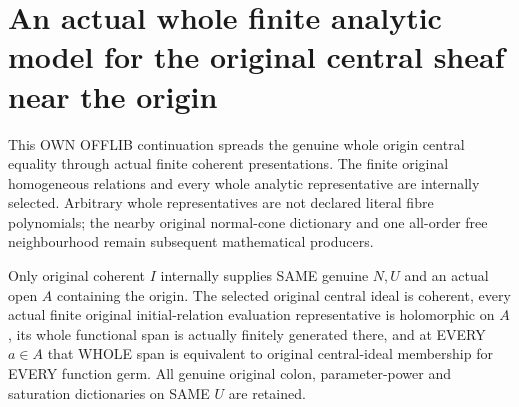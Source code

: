 \section{An actual whole finite analytic model for the original central sheaf near the origin}
This OWN OFFLIB continuation spreads the genuine whole origin central equality through actual finite coherent presentations. The finite original homogeneous relations and every whole analytic representative are internally selected. Arbitrary whole representatives are not declared literal fibre polynomials; the nearby original normal-cone dictionary and one all-order free neighbourhood remain subsequent mathematical producers.

\begin{theorem}
\label{hir:relative-normal-graph-central-nearby-whole-finite-model}
\leanok
Only original coherent $I$ internally supplies SAME genuine $N,U$ and an actual open $A$ containing the origin. The selected original central ideal is coherent, every actual finite original initial-relation evaluation representative is holomorphic on $A$, its whole functional span is actually finitely generated there, and at EVERY $a\in A$ that WHOLE span is equivalent to original central-ideal membership for EVERY function germ. All genuine original colon, parameter-power and saturation dictionaries on SAME $U$ are retained.
\end{theorem}
